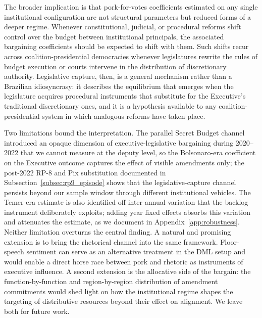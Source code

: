 \documentclass[preprint,12pt,authoryear]{elsarticle}
\begin{document}
The broader implication is that pork-for-votes coefficients estimated on any single institutional configuration are not structural parameters but reduced forms of a deeper regime. Whenever constitutional, judicial, or procedural reforms shift control over the budget between institutional principals, the associated bargaining coefficients should be expected to shift with them. Such shifts recur across coalition-presidential democracies whenever legislatures rewrite the rules of budget execution or courts intervene in the distribution of discretionary authority. Legislative capture, then, is a general mechanism rather than a Brazilian idiosyncrasy: it describes the equilibrium that emerges when the legislature acquires procedural instruments that substitute for the Executive's traditional discretionary ones, and it is a hypothesis available to any coalition-presidential system in which analogous reforms have taken place.

Two limitations bound the interpretation. The parallel Secret Budget channel introduced an opaque dimension of executive-legislative bargaining during 2020--2022 that we cannot measure at the deputy level, so the Bolsonaro-era coefficient on the Executive outcome captures the effect of visible amendments only; the post-2022 RP-8 and Pix substitution documented in Subsection~\ref{subsec:rp9_episode} shows that the legislative-capture channel persists beyond our sample window through different institutional vehicles. The Temer-era estimate is also identified off inter-annual variation that the backlog instrument deliberately exploits; adding year fixed effects absorbs this variation and attenuates the estimate, as we document in Appendix~\ref{app:robustness}. Neither limitation overturns the central finding. A natural and promising extension is to bring the rhetorical channel into the same framework. Floor-speech sentiment can serve as an alternative treatment in the DML setup and would enable a direct horse race between pork and rhetoric as instruments of executive influence. A second extension is the allocative side of the bargain: the function-by-function and region-by-region distribution of amendment commitments would shed light on how the institutional regime shapes the targeting of distributive resources beyond their effect on alignment. We leave both for future work.




\appendix
\renewcommand{\thesection}{\Alph{section}}
\renewcommand{\sectionautorefname}{Appendix}
\setcounter{section}{0}
\renewcommand{\thesection}{Appendix \Alph{section}}
\end{document}
